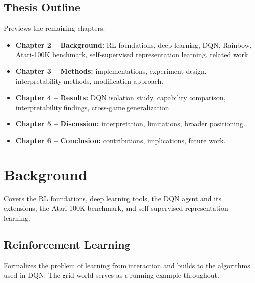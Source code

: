\documentclass[11pt]{article}
\begin{document}
\subsection{Thesis Outline}

\noindent Previews the remaining chapters.

\begin{itemize}
\item \textbf{Chapter 2 -- Background:} RL foundations, deep learning,
  DQN, Rainbow, Atari-100K benchmark, self-supervised representation
  learning, related work.
\item \textbf{Chapter 3 -- Methods:} implementations, experiment
  design, interpretability methods, modification approach.
\item \textbf{Chapter 4 -- Results:} DQN isolation study, capability
  comparison, interpretability findings, cross-game generalization.
\item \textbf{Chapter 5 -- Discussion:} interpretation, limitations,
  broader positioning.
\item \textbf{Chapter 6 -- Conclusion:} contributions, implications,
  future work.
\end{itemize}

\section{Background}

\noindent Covers the RL foundations, deep learning tools, the DQN agent
and its extensions, the Atari-100K benchmark, and self-supervised
representation learning.

\subsection{Reinforcement Learning}

\noindent Formalizes the problem of learning from interaction and builds
to the algorithms used in DQN. The grid-world serves as a running
example throughout.
\end{document}
